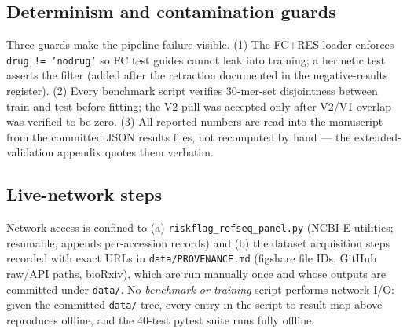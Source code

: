 \subsection{Determinism and contamination guards}
Three guards make the pipeline failure-visible. (1) The FC+RES loader
enforces \texttt{drug != 'nodrug'} so FC test guides cannot leak into
training; a hermetic test asserts the filter (added after the retraction
documented in the negative-results register). (2) Every benchmark script
verifies 30-mer-set disjointness between train and test before fitting;
the V2 pull was accepted only after V2/V1 overlap was verified to be zero.
(3) All reported numbers are read into the manuscript from the committed
JSON results files, not recomputed by hand --- the extended-validation
appendix quotes them verbatim.

\subsection{Live-network steps}
Network access is confined to (a) \texttt{riskflag\_refseq\_panel.py}
(NCBI E-utilities; resumable, appends per-accession records) and (b) the
dataset acquisition steps recorded with exact URLs in
\texttt{data/PROVENANCE.md} (figshare file IDs, GitHub raw/API paths,
bioRxiv), which are run manually once and whose outputs are committed under
\texttt{data/}. No \emph{benchmark or training} script performs network
I/O: given the committed \texttt{data/} tree, every entry in the
script-to-result map above reproduces offline, and the 40-test pytest
suite runs fully offline.
